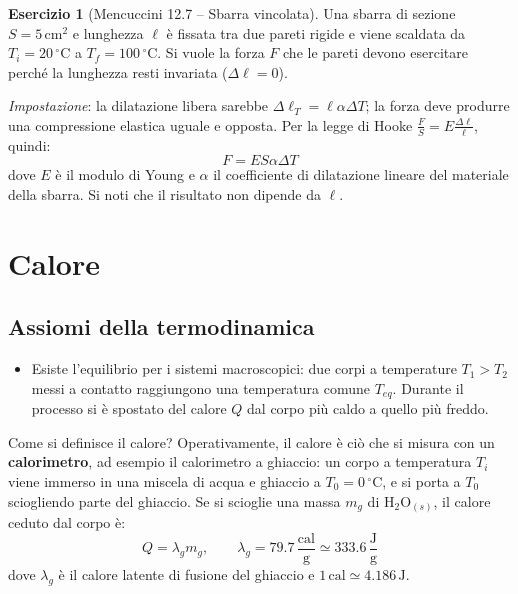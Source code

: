 \documentclass[11pt, a4paper, openright]{book}
\theoremstyle{plain}
\theoremstyle{definition}
\newtheorem{esercizio}[teorema]{Esercizio}
\theoremstyle{remark}
\begin{document}
\begin{esercizio}[Mencuccini 12.7 -- Sbarra vincolata]
    Una sbarra di sezione $S = 5\,\text{cm}^2$ e lunghezza $\ell$ è fissata tra due pareti rigide e viene scaldata da $T_i = 20\,^\circ\text{C}$ a $T_f = 100\,^\circ\text{C}$. Si vuole la forza $F$ che le pareti devono esercitare perché la lunghezza resti invariata ($\Delta\ell = 0$).

    \textit{Impostazione}: la dilatazione libera sarebbe $\Delta\ell_T = \ell\alpha\Delta T$; la forza deve produrre una compressione elastica uguale e opposta. Per la legge di Hooke $\frac{F}{S} = E\frac{\Delta\ell}{\ell}$, quindi:
    \begin{equation}
        F = E S \alpha \Delta T
    \end{equation}
    dove $E$ è il modulo di Young e $\alpha$ il coefficiente di dilatazione lineare del materiale della sbarra. Si noti che il risultato non dipende da $\ell$.
\end{esercizio}

\section{Calore}
\subsection{Assiomi della termodinamica}
\begin{itemize}
    \item[0:] Esiste l'equilibrio per i sistemi macroscopici: due corpi a temperature $T_1 > T_2$ messi a contatto raggiungono una temperatura comune $T_{eq}$. Durante il processo si è spostato del calore $Q$ dal corpo più caldo a quello più freddo.
\end{itemize}

Come si definisce il calore? Operativamente, il calore è ciò che si misura con un \textbf{calorimetro}, ad esempio il calorimetro a ghiaccio: un corpo a temperatura $T_i$ viene immerso in una miscela di acqua e ghiaccio a $T_0 = 0\,^\circ\text{C}$, e si porta a $T_0$ sciogliendo parte del ghiaccio. Se si scioglie una massa $m_g$ di $\text{H}_2\text{O}_{(s)}$, il calore ceduto dal corpo è:
\begin{equation}
    Q = \lambda_g m_g, \qquad \lambda_g = 79.7\,\frac{\text{cal}}{\text{g}} \simeq 333.6\,\frac{\text{J}}{\text{g}}
\end{equation}
dove $\lambda_g$ è il calore latente di fusione del ghiaccio e $1\,\text{cal} \simeq 4.186\,\text{J}$.
\end{document}
